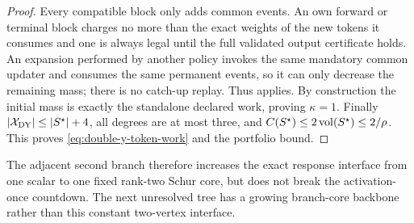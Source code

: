 \begin{proof}
Every compatible block only adds common events.  An own forward or terminal
block charges no more than the exact weights of the new tokens it consumes and
one is always legal until the full validated output certificate holds.  An
expansion performed by another policy invokes the same mandatory common
updater and consumes the same permanent events, so it can only decrease the
remaining mass; there is no catch-up replay.  Thus
 applies.  By construction the initial
mass is exactly the standalone declared work, proving $\kappa=1$.  Finally
$\left\lvert \mathcal X_{\rm DY} \right\rvert\leq\left\lvert S^\star \right\rvert+4$, all degrees are at most three,
and
$C(S^\star)\leq2\operatorname{vol}(S^\star)\leq2/\rho$.  This proves
\eqref{eq:double-y-token-work} and the portfolio bound.
\end{proof}

The adjacent second branch therefore increases the exact response interface
from one scalar to one fixed rank-two Schur core, but does not break the
activation-once countdown.  The next unresolved tree has a growing branch-core
backbone rather than this constant two-vertex interface.

